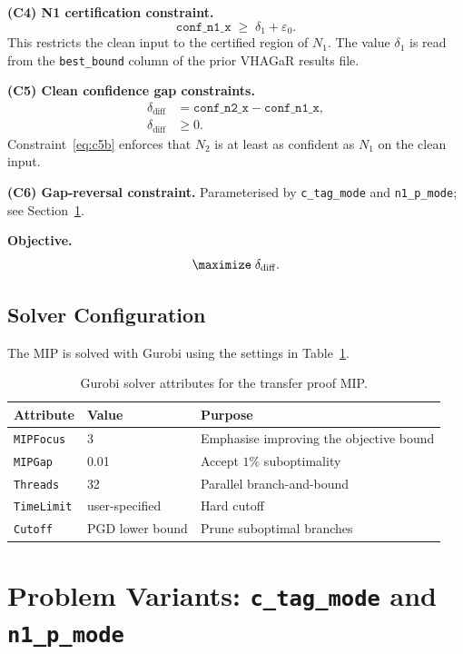 \documentclass[11pt,a4paper]{article}
\theoremstyle{definition}
\theoremstyle{plain}
\newcommand{\NN}[1]{N_{#1}}
\newcommand{\epszero}{\varepsilon_0}
\newcommand{\deltadiff}{\delta_{\mathrm{diff}}}
\newcommand{\deltaone}{\delta_1}
\begin{document}
\medskip
\noindent\textbf{(C4) N1 certification constraint.}
\[
  \mathtt{conf\_n1\_x} \;\ge\; \deltaone + \epszero.
\]
This restricts the clean input to the certified region of $\NN{1}$. The value $\deltaone$ is read from the \texttt{best\_bound} column of the prior VHAGaR results file.

\medskip
\noindent\textbf{(C5) Clean confidence gap constraints.}
\begin{align}
  \deltadiff &= \mathtt{conf\_n2\_x} - \mathtt{conf\_n1\_x}, \label{eq:c5a} \\
  \deltadiff &\ge 0. \label{eq:c5b}
\end{align}
Constraint~\eqref{eq:c5b} enforces that $\NN{2}$ is at least as confident as $\NN{1}$ on the clean input.

\medskip
\noindent\textbf{(C6) Gap-reversal constraint.}
Parameterised by \texttt{c\_tag\_mode} and \texttt{n1\_p\_mode}; see Section~\ref{sec:variants}.

\medskip
\noindent\textbf{Objective.}
\[
  \maximize\; \deltadiff.
\]

\subsection{Solver Configuration}

The MIP is solved with Gurobi using the settings in Table~\ref{tab:gurobi}.

\begin{table}[h]
\centering
\caption{Gurobi solver attributes for the transfer proof MIP.}
\label{tab:gurobi}
\begin{tabular}{lll}
\toprule
\textbf{Attribute} & \textbf{Value} & \textbf{Purpose} \\
\midrule
\texttt{MIPFocus} & 3 & Emphasise improving the objective bound \\
\texttt{MIPGap}   & 0.01 & Accept $1\%$ suboptimality \\
\texttt{Threads}  & 32 & Parallel branch-and-bound \\
\texttt{TimeLimit} & user-specified & Hard cutoff \\
\texttt{Cutoff}   & PGD lower bound & Prune suboptimal branches \\
\bottomrule
\end{tabular}
\end{table}

\section{Problem Variants: \texttt{c\_tag\_mode} and \texttt{n1\_p\_mode}}
\label{sec:variants}
\end{document}
